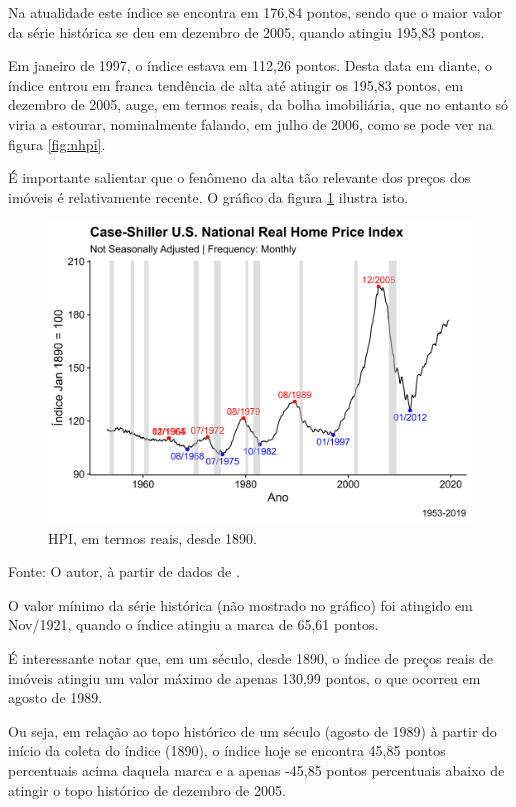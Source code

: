 \documentclass[
	12pt,				%
	oneside,			%
	a4paper,			%
	chapter=TITLE,		%
	section=TITLE,		%
	english,			%
	brazil				%
	]{abntex2}
\newcommand{\bcenter}{\begin{center}}
\newcommand{\ecenter}{\end{center}}
\begin{document}
Na atualidade este índice se encontra em 176,84 pontos, sendo que o
maior valor da série histórica se deu em dezembro de 2005, quando
atingiu 195,83 pontos.

Em janeiro de 1997, o índice estava em 112,26 pontos. Desta data em
diante, o índice entrou em franca tendência de alta até atingir os
195,83 pontos, em dezembro de 2005, auge, em termos reais, da bolha
imobiliária, que no entanto só viria a estourar, nominalmente falando,
em julho de 2006, como se pode ver na figura \ref{fig:nhpi}.

É importante salientar que o fenômeno da alta tão relevante dos preços
dos imóveis é relativamente recente. O gráfico da figura \ref{fig:rhpi2}
ilustra isto.
\begin{figure}[H]

{\centering \includegraphics[width=0.7\linewidth]{images/rhpi2-1} 

}

\caption{HPI, em termos reais, desde 1890.}\label{fig:rhpi2}
\end{figure}
\bcenter
Fonte: O autor, à partir de dados de \textcite{QuandlWIKI}. \ecenter

O valor mínimo da série histórica (não mostrado no gráfico) foi atingido
em\\
Nov/1921, quando o índice atingiu a marca de 65,61 pontos.

É interessante notar que, em um século, desde 1890, o índice de preços
reais de imóveis atingiu um valor máximo de apenas 130,99 pontos, o que
ocorreu em agosto de 1989.

Ou seja, em relação ao topo histórico de um século (agosto de 1989) à
partir do início da coleta do índice (1890), o índice hoje se encontra
45,85 pontos percentuais acima daquela marca e a apenas -45,85 pontos
percentuais abaixo de atingir o topo histórico de dezembro de 2005.
\end{document}

